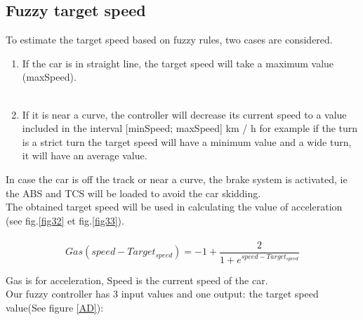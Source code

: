 \documentclass{llncs}
\begin{document}
\subsection{Fuzzy target speed}
To estimate the target speed  based on fuzzy rules, two cases are considered.
\begin{enumerate}
	\item If the car is in straight line, the target speed will take a maximum value (maxSpeed).\\\\
	\item If it is near a curve, the controller will decrease its current speed to a value included in the interval [minSpeed; maxSpeed] km / h for example if the turn is a strict turn the target speed will have a minimum value and a wide turn, it will have an average value.
	
\end{enumerate}
In case the car is off the track or near a curve, the brake system is activated, ie the ABS and TCS will be loaded to avoid the car skidding.
\\
The obtained target speed will be used in calculating the value of acceleration
(see fig.\ref{fig32} et fig.\ref{fig33}).
\\\\
\begin{equation}	
Gas(speed-Target_{speed})=-1+\frac{2}{1+e^{speed-Target_{speed}}}	
\end{equation}

Gas is for acceleration, Speed is the  current speed of the car.\\
Our fuzzy controller has 3 input values and one output: the target speed value(See figure \ref{AD}):
\end{document}
